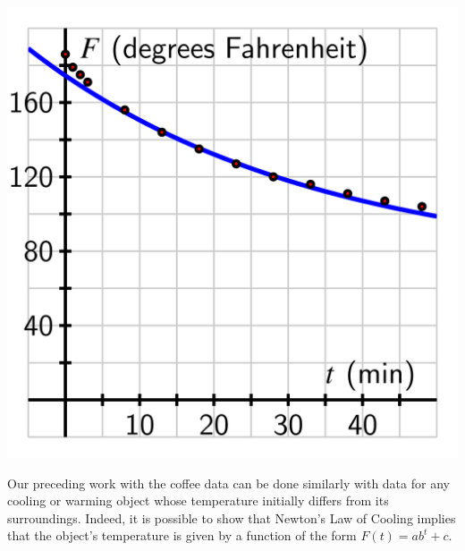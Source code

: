 \documentclass[nooutcomes]{ximera}
\begin{document}
\begin{image}
\includegraphics{modeling-coffee-original.jpg}
\end{image}

Our preceding work with the coffee data can be done similarly with data for any cooling or warming object whose temperature initially differs from its surroundings.  Indeed, it is possible to show that Newton's Law of Cooling implies that the object's temperature is given by a function of the form $F(t) = ab^t + c$.
\end{document}
